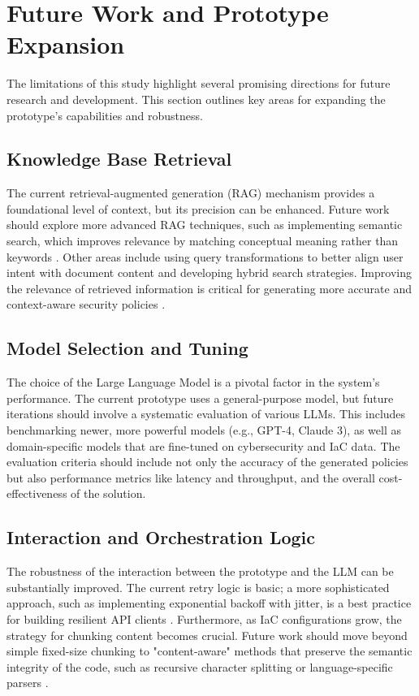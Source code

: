 \section{Future Work and Prototype Expansion}
\label{sec:future_work}

The limitations of this study highlight several promising directions for future research and development. This section outlines key areas for expanding the prototype's capabilities and robustness.

\subsection{Knowledge Base Retrieval}
The current retrieval-augmented generation (RAG) mechanism provides a foundational level of context, but its precision can be enhanced. Future work should explore more advanced RAG techniques, such as implementing semantic search, which improves relevance by matching conceptual meaning rather than keywords \cite{zoomin_benefits_2024}. Other areas include using query transformations to better align user intent with document content and developing hybrid search strategies. Improving the relevance of retrieved information is critical for generating more accurate and context-aware security policies \cite{openai_retrieval_2025}.

\subsection{Model Selection and Tuning}
The choice of the Large Language Model is a pivotal factor in the system's performance. The current prototype uses a general-purpose model, but future iterations should involve a systematic evaluation of various LLMs. This includes benchmarking newer, more powerful models (e.g., GPT-4, Claude 3), as well as domain-specific models that are fine-tuned on cybersecurity and IaC data. The evaluation criteria should include not only the accuracy of the generated policies but also performance metrics like latency and throughput, and the overall cost-effectiveness of the solution.

\subsection{Interaction and Orchestration Logic}
The robustness of the interaction between the prototype and the LLM can be substantially improved. The current retry logic is basic; a more sophisticated approach, such as implementing exponential backoff with jitter, is a best practice for building resilient API clients \cite{doordash_best_nodate}. Furthermore, as IaC configurations grow, the strategy for chunking content becomes crucial. Future work should move beyond simple fixed-size chunking to "content-aware" methods that preserve the semantic integrity of the code, such as recursive character splitting or language-specific parsers \cite{pinecone_chunking_2025}.

